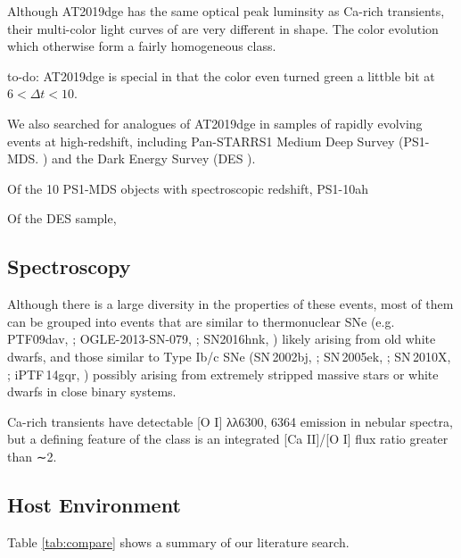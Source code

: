 \documentclass[twocolumn]{aastex63}
\newcommand{\todo}[1]{{\color{magenta} to-do: {#1}}}
\begin{document}
\begin{CJK*}{UTF8}{gbsn}
Although AT2019dge has the same optical peak luminsity as Ca-rich transients, their multi-color light 
curves of are very different in shape. The color evolution  which otherwise form a fairly homogeneous 
class. 

\todo{AT2019dge is special in that the color even turned green a littble bit at $6<\Delta t<10$.}

We 
also searched for analogues of AT2019dge in samples of rapidly evolving events at high-redshift, 
including Pan-STARRS1 Medium Deep Survey (PS1-MDS. \citealt{Drout2014}) and the Dark Energy 
Survey (DES \citealt{Pursiainen2018}). 

Of the 10 PS1-MDS objects with spectroscopic redshift, PS1-10ah

Of the DES sample, 


\subsection{Spectroscopy}

Although there is a large diversity in the properties of these events, most of them can be 
grouped into events that are similar to thermonuclear SNe (e.g. PTF09dav, \citealt{Sullivan2011}; 
OGLE-2013-SN-079, \citealt{Inserra2015}; SN2016hnk, \citealt{Galbany2019, Jacobson-Galan2019}) 
likely arising from old white dwarfs, and those similar to Type Ib/c SNe (SN\,2002bj, 
\citealt{Poznanski2010}; SN\,2005ek, \citealt{Drout2013}; SN\,2010X, \citealt{Kasliwal2010}; iPTF\,14gqr, 
\citealt{De2018}) possibly arising from extremely stripped massive stars or white dwarfs in close binary 
systems.

Ca-rich transients have detectable [O I] λλ6300, 6364 emission in nebular spectra, but a defining 
feature of the class is an integrated [Ca II]/[O I] flux ratio greater than ∼2. 

\subsection{Host Environment}

Table \ref{tab:compare} shows a summary of our literature search.


\end{CJK*}
\end{document}
